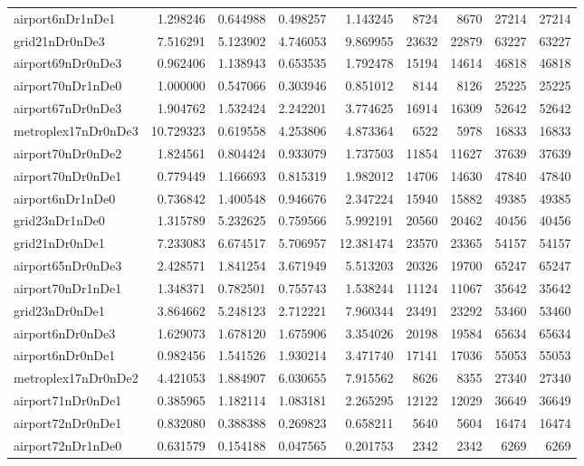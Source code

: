 \begin{longtable}{|l|r|r|r|r|r|r|r|r|}
airport6nDr1nDe1 & 1.298246 & 0.644988 & 0.498257 & 1.143245 & 8724 & 8670 & 27214 & 27214 \\
grid21nDr0nDe3 & 7.516291 & 5.123902 & 4.746053 & 9.869955 & 23632 & 22879 & 63227 & 63227 \\
airport69nDr0nDe3 & 0.962406 & 1.138943 & 0.653535 & 1.792478 & 15194 & 14614 & 46818 & 46818 \\
airport70nDr1nDe0 & 1.000000 & 0.547066 & 0.303946 & 0.851012 & 8144 & 8126 & 25225 & 25225 \\
airport67nDr0nDe3 & 1.904762 & 1.532424 & 2.242201 & 3.774625 & 16914 & 16309 & 52642 & 52642 \\
metroplex17nDr0nDe3 & 10.729323 & 0.619558 & 4.253806 & 4.873364 & 6522 & 5978 & 16833 & 16833 \\
airport70nDr0nDe2 & 1.824561 & 0.804424 & 0.933079 & 1.737503 & 11854 & 11627 & 37639 & 37639 \\
airport70nDr0nDe1 & 0.779449 & 1.166693 & 0.815319 & 1.982012 & 14706 & 14630 & 47840 & 47840 \\
airport6nDr1nDe0 & 0.736842 & 1.400548 & 0.946676 & 2.347224 & 15940 & 15882 & 49385 & 49385 \\
grid23nDr1nDe0 & 1.315789 & 5.232625 & 0.759566 & 5.992191 & 20560 & 20462 & 40456 & 40456 \\
grid21nDr0nDe1 & 7.233083 & 6.674517 & 5.706957 & 12.381474 & 23570 & 23365 & 54157 & 54157 \\
airport65nDr0nDe3 & 2.428571 & 1.841254 & 3.671949 & 5.513203 & 20326 & 19700 & 65247 & 65247 \\
airport70nDr1nDe1 & 1.348371 & 0.782501 & 0.755743 & 1.538244 & 11124 & 11067 & 35642 & 35642 \\
grid23nDr0nDe1 & 3.864662 & 5.248123 & 2.712221 & 7.960344 & 23491 & 23292 & 53460 & 53460 \\
airport6nDr0nDe3 & 1.629073 & 1.678120 & 1.675906 & 3.354026 & 20198 & 19584 & 65634 & 65634 \\
airport6nDr0nDe1 & 0.982456 & 1.541526 & 1.930214 & 3.471740 & 17141 & 17036 & 55053 & 55053 \\
metroplex17nDr0nDe2 & 4.421053 & 1.884907 & 6.030655 & 7.915562 & 8626 & 8355 & 27340 & 27340 \\
airport71nDr0nDe1 & 0.385965 & 1.182114 & 1.083181 & 2.265295 & 12122 & 12029 & 36649 & 36649 \\
airport72nDr0nDe1 & 0.832080 & 0.388388 & 0.269823 & 0.658211 & 5640 & 5604 & 16474 & 16474 \\
airport72nDr1nDe0 & 0.631579 & 0.154188 & 0.047565 & 0.201753 & 2342 & 2342 & 6269 & 6269 \\

\end{longtable}
